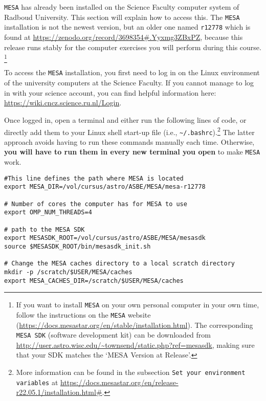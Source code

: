 \documentclass[11pt,a4paper]{article}
\begin{document}
\texttt{MESA} has already been installed on the Science Faculty computer system of Radboud University. This section will explain how to access this. The \texttt{MESA} installation is not the newest version, but an older one named \texttt{r12778} which is found at \url{https://zenodo.org/record/3698354#.Yyxmg3ZBxPZ}, because this release runs stably for the computer exercises you will perform during this course.
\footnote{If you want to install \texttt{MESA} on your own personal computer in your own time, follow the instructions on the \texttt{MESA} website (\url{https://docs.mesastar.org/en/stable/installation.html}). The corresponding \texttt{MESA SDK} (software development kit) can be downloaded from \url{http://user.astro.wisc.edu/~townsend/static.php?ref=mesasdk}, making sure that your SDK matches the `MESA Version at Release'. }

\bigskip\noindent
To access the \texttt{MESA} installation, you first need to log in on the Linux environment of the university computers at the Science Faculty. If you cannot manage to log in with your science account, you can find helpful information here: \url{https://wiki.cncz.science.ru.nl/Login}. 

\bigskip\noindent

Once logged in, open a terminal and either run the following lines of code, or directly add them to your Linux shell start-up file (i.e., \verb|~/.bashrc|).\footnote{More information can be found in the subsection \texttt{Set your environment variables} at \url{https://docs.mesastar.org/en/release-r22.05.1/installation.html\#}.}
%
The latter approach avoids having to run these commands manually each time. Otherwise, \textbf{you will have to run them in every new terminal you open} to make \texttt{MESA} work.

\begin{lstlisting}
#This line defines the path where MESA is located 
export MESA_DIR=/vol/cursus/astro/ASBE/MESA/mesa-r12778

# Number of cores the computer has for MESA to use
export OMP_NUM_THREADS=4

# path to the MESA SDK
export MESASDK_ROOT=/vol/cursus/astro/ASBE/MESA/mesasdk
source $MESASDK_ROOT/bin/mesasdk_init.sh

# Change the MESA caches directory to a local scratch directory
mkdir -p /scratch/$USER/MESA/caches
export MESA_CACHES_DIR=/scratch/$USER/MESA/caches
\end{lstlisting}
\end{document}
